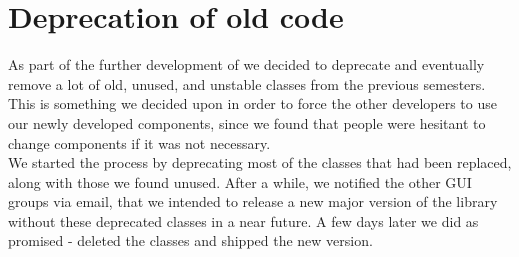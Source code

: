 
\section{Deprecation of old code}
\label{sec:deprecation_of_old_code}

As part of the further development of \gc we decided to deprecate and eventually remove a lot of old, unused, and unstable classes from the previous semesters. This is something we decided upon in order to force the other developers to use our newly developed components, since we found that people were hesitant to change components if it was not necessary.\\

We started the process by deprecating most of the classes that had been replaced, along with those we found unused. After a while, we notified the other GUI groups via email, that we intended to release a new major version of the \gc library without these deprecated classes in a near future. A few days later we did as promised - deleted the classes and shipped the new version. 